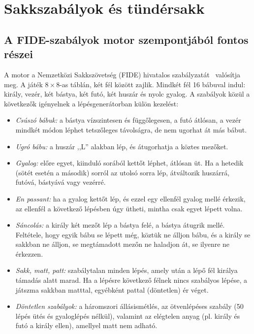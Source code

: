 \chapter{Sakkszabályok és tündérsakk}\label{chap:rules}

\section{A FIDE-szabályok motor szempontjából fontos részei}

A motor a Nemzetközi Sakkszövetség (FIDE) hivatalos szabályzatát~\cite{FIDELaws} valósítja meg. A játék $8\times8$-as táblán, két fél között zajlik. Mindkét fél 16 bábuval indul: király, vezér, két bástya, két futó, két huszár és nyolc gyalog. A szabályok közül a következők igényelnek a lépésgenerátorban külön kezelést:

\begin{itemize}
	\item \emph{Csúszó bábuk:} a bástya vízszintesen és függőlegesen, a futó átlósan, a vezér mindkét módon léphet tetszőleges távolságra, de nem ugorhat át más bábut.
	\item \emph{Ugró bábu:} a huszár ,,L'' alakban lép, és átugorhatja a köztes mezőket.
	\item \emph{Gyalog:} előre egyet, kiinduló sorából kettőt léphet, átlósan üt. Ha a hetedik (sötét esetén a második) sorról az utolsó sorra lép, átváltozik huszárrá, futóvá, bástyává vagy vezérré.
	\item \emph{En passant:} ha a gyalog kettőt lép, és ezzel egy ellenfél gyalog mellé érkezik, az ellenfél a következő lépésben úgy ütheti, mintha csak egyet lépett volna.
	\item \emph{Sáncolás:} a király két mezőt lép a bástya felé, a bástya átugrik mellé. Feltétele, hogy egyik bábu se lépett még, köztük ne álljon bábu, és a király se sakkban ne álljon, se megtámadott mezőn ne haladjon át, se ilyenre ne érkezzen.
	\item \emph{Sakk, matt, patt:} szabálytalan minden lépés, amely után a lépő fél királya támadás alatt marad. Ha a lépésre következő félnek nincs szabályos lépése, a játszma sakkban matttal, egyébként pattal (döntetlen) ér véget.
	\item \emph{Döntetlen szabályok:} a háromszori állásismétlés, az ötvenlépéses szabály (50 lépés ütés és gyaloglépés nélkül), valamint az elégtelen anyag (pl. király és futó a király ellen), amellyel matt nem adható.
\end{itemize}


